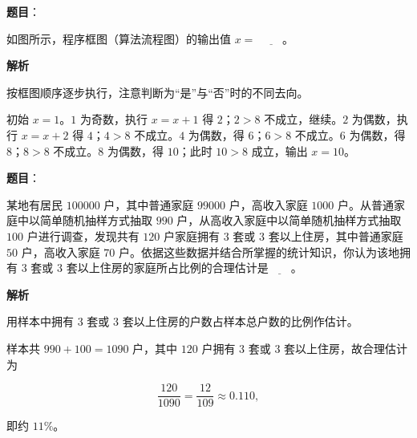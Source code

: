 \begin{answer}

\textbf{题目}：

如图所示，程序框图（算法流程图）的输出值 $x=$ $\underline{\qquad}$。
\nopagebreak[4]
\begin{center}\end{center}
\nopagebreak[4]
\textbf{解析}

按框图顺序逐步执行，注意判断为“是”与“否”时的不同去向。

初始 $x=1$。$1$ 为奇数，执行 $x=x+1$ 得 $2$；$2>8$ 不成立，继续。$2$ 为偶数，执行 $x=x+2$ 得 $4$；$4>8$ 不成立。$4$ 为偶数，得 $6$；$6>8$ 不成立。$6$ 为偶数，得 $8$；$8>8$ 不成立。$8$ 为偶数，得 $10$；此时 $10>8$ 成立，输出 $x=10$。


\end{answer}
\begin{answer}

\textbf{题目}：

某地有居民 $100000$ 户，其中普通家庭 $99000$ 户，高收入家庭 $1000$ 户。从普通家庭中以简单随机抽样方式抽取 $990$ 户，从高收入家庭中以简单随机抽样方式抽取 $100$ 户进行调查，发现共有 $120$ 户家庭拥有 $3$ 套或 $3$ 套以上住房，其中普通家庭 $50$ 户，高收入家庭 $70$ 户。依据这些数据并结合所掌握的统计知识，你认为该地拥有 $3$ 套或 $3$ 套以上住房的家庭所占比例的合理估计是$\underline{\qquad}$。

\textbf{解析}

用样本中拥有 $3$ 套或 $3$ 套以上住房的户数占样本总户数的比例作估计。

样本共 $990+100=1090$ 户，其中 $120$ 户拥有 $3$ 套或 $3$ 套以上住房，故合理估计为

\nopagebreak[4]
\[\frac{120}{1090}=\frac{12}{109}\approx0.110,\]

即约 $11\%$。


\end{answer}
